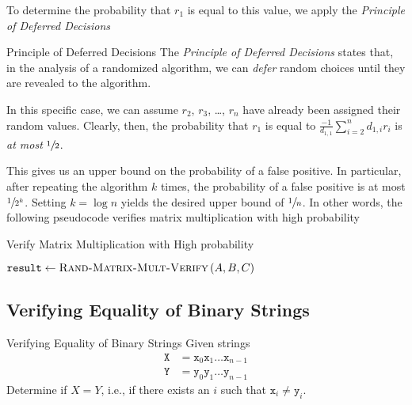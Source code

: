 To determine the probability that $r_1$ is equal to this value, we apply the
\emph{Principle of Deferred Decisions}
\begin{definition}{Principle of Deferred Decisions}{}
    The \emph{Principle of Deferred Decisions} states that, in the analysis of a
    randomized algorithm, we can \emph{defer} random choices until they are
    revealed to the algorithm.  
\end{definition}

In this specific case, we can assume $r_2$, $r_3$, \dots, $r_n$ have already
been assigned their random values. Clearly, then, the probability that $r_1$ is
equal to $\frac{-1}{d_{1,1}}\sum_{i=2}^n d_{1,i}r_i$ is \emph{at most}
$\sfrac{1}{2}$. 

This gives us an upper bound on the probability of a false positive. In
particular, after repeating the algorithm $k$ times, the probability of a false
positive is at most $\sfrac{1}{2^k}$. Setting $k = \log{n}$ yields the desired
upper bound of $\sfrac{1}{n}$. In other words, the following pseudocode verifies
matrix multiplication with high probability

\begin{algorithm}
    \caption{Verify Matrix Multiplication with High probability}
    \begin{algorithmic}[1]
                \State $\texttt{result} \gets \Call{Rand-Matrix-Mult-Verify}{A, B, C}$
                    \State \Return \False
                \EndIf
            \EndForRange
            \State \Return \True
        \EndFunction
    \end{algorithmic}
\end{algorithm}

\subsection{Verifying Equality of Binary Strings}
\begin{problem}{Verifying Equality of Binary Strings}{}
    Given strings
    \begin{align*}
        \texttt{X} &= \texttt{x}_0 \texttt{x}_1 \dots \texttt{x}_{n-1}\\
        \texttt{Y} &= \texttt{y}_0 \texttt{y}_1 \dots \texttt{y}_{n-1} 
    \end{align*}
    Determine if $X = Y$, i.e., if there exists an $i$ such that $\texttt{x}_i
    \neq \texttt{y}_i$.
\end{problem}

